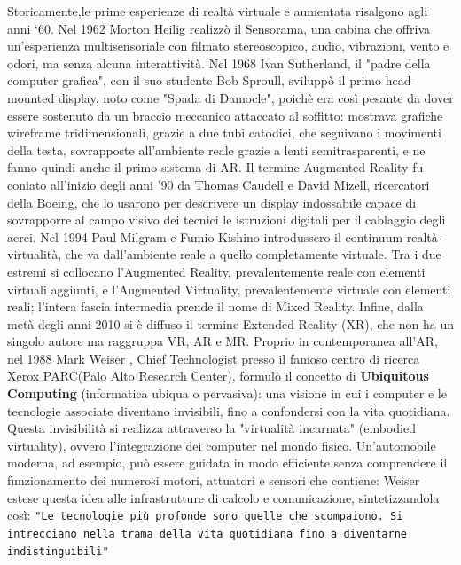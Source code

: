 Storicamente\cite{augmented-reality-3},le prime esperienze di realtà virtuale e aumentata risalgono agli anni ‘60. Nel 1962 Morton Heilig realizzò il Sensorama, una cabina che offriva un’esperienza multisensoriale con filmato stereoscopico, audio, vibrazioni, vento e odori, ma senza alcuna interattività. Nel 1968 Ivan Sutherland, il "padre della computer grafica", con il suo studente Bob Sproull, sviluppò il primo head-mounted display, noto come "Spada di Damocle", poichè era così pesante da dover essere sostenuto da un braccio meccanico attaccato al soffitto: mostrava grafiche wireframe tridimensionali, grazie a due tubi catodici, che seguivano i movimenti della testa, sovrapposte all’ambiente reale grazie a lenti semitrasparenti, e ne fanno quindi anche il primo sistema di AR. Il termine Augmented Reality fu coniato all’inizio degli anni '90 da Thomas Caudell e David Mizell, ricercatori della Boeing, che lo usarono per descrivere un display indossabile capace di sovrapporre al campo visivo dei tecnici le istruzioni digitali per il cablaggio degli aerei. Nel 1994 Paul Milgram e Fumio Kishino introdussero il continuum realtà-virtualità, che va dall’ambiente reale a quello completamente virtuale. Tra i due estremi si collocano l’Augmented Reality, prevalentemente reale con elementi virtuali aggiunti, e l’Augmented Virtuality, prevalentemente virtuale con elementi reali; l’intera fascia intermedia prende il nome di Mixed Reality. Infine, dalla metà degli anni 2010 si è diffuso il termine Extended Reality (XR), che non ha un singolo autore ma raggruppa VR, AR e MR.
Proprio in contemporanea all'AR, nel 1988 Mark Weiser \cite{ubiquitous-computing-1}\cite{ubiquitous-computing-2}\cite{ubiquitous-computing-3}, Chief Technologist presso il famoso centro di ricerca Xerox PARC(Palo Alto Research Center), formulò il concetto di \textbf{Ubiquitous Computing} (informatica ubiqua o pervasiva): una visione in cui i computer e le tecnologie associate diventano invisibili, fino a confondersi con la vita quotidiana. Questa invisibilità si realizza attraverso la "virtualità incarnata" (embodied virtuality), ovvero l’integrazione dei computer nel mondo fisico. Un’automobile moderna, ad esempio, può essere guidata in modo efficiente senza comprendere il funzionamento dei numerosi motori, attuatori e sensori che contiene: Weiser estese questa idea alle infrastrutture di calcolo e comunicazione, sintetizzandola così: \texttt{"Le tecnologie più profonde sono quelle che scompaiono. Si intrecciano nella trama della vita quotidiana fino a \newline diventarne indistinguibili"}\cite{ubiquitous-computing-3} \newline

